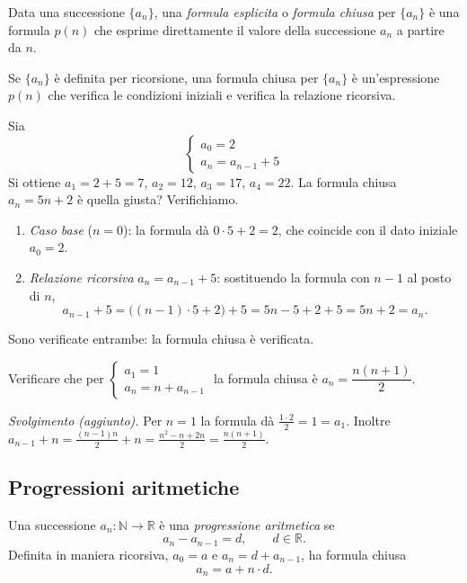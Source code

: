 \documentclass[11pt,a4paper]{article}
\begin{document}
\begin{definizione}
Data una successione $\{a_n\}$, una \emph{formula esplicita} o
\emph{formula chiusa} per $\{a_n\}$ è una formula $p(n)$ che esprime
direttamente il valore della successione $a_n$ a partire da $n$.

Se $\{a_n\}$ è definita per ricorsione, una formula chiusa per $\{a_n\}$ è
un'espressione $p(n)$ che verifica le condizioni iniziali e verifica la
relazione ricorsiva.
\end{definizione}

\begin{esempio}
Sia
\[
  \begin{cases}
    a_0 = 2\\
    a_n = a_{n-1} + 5
  \end{cases}
\]
Si ottiene $a_1 = 2 + 5 = 7$, $a_2 = 12$, $a_3 = 17$, $a_4 = 22$. La formula
chiusa $a_n = 5n + 2$ è quella giusta? Verifichiamo.
\begin{enumerate}
    \item \emph{Caso base} ($n = 0$): la formula dà $0 \cdot 5 + 2 = 2$, che
          coincide con il dato iniziale $a_0 = 2$.
    \item \emph{Relazione ricorsiva} $a_n = a_{n-1} + 5$: sostituendo la
          formula con $n-1$ al posto di $n$,
          \[
            a_{n-1} + 5 = \bigl( (n-1) \cdot 5 + 2 \bigr) + 5
            = 5n - 5 + 2 + 5 = 5n + 2 = a_n .
          \]
\end{enumerate}
Sono verificate entrambe: la formula chiusa è verificata.
\end{esempio}

\begin{esercizio}
Verificare che per
$\begin{cases} a_1 = 1\\ a_n = n + a_{n-1} \end{cases}$
la formula chiusa è $a_n = \dfrac{n(n+1)}{2}$.
\end{esercizio}

\emph{Svolgimento (aggiunto).} Per $n = 1$ la formula dà $\frac{1 \cdot 2}{2} = 1 = a_1$.
Inoltre
$a_{n-1} + n = \frac{(n-1)n}{2} + n = \frac{n^2 - n + 2n}{2} = \frac{n(n+1)}{2}$.

\subsection{Progressioni aritmetiche}

\begin{definizione}
Una successione $a_n \colon \mathbb{N} \to \mathbb{R}$ è una
\emph{progressione aritmetica} se
\[
  a_n - a_{n-1} = d, \qquad d \in \mathbb{R}.
\]
Definita in maniera ricorsiva, $a_0 = a$ e $a_n = d + a_{n-1}$, ha formula
chiusa
\[
  a_n = a + n \cdot d .
\]
\end{definizione}
\end{document}
